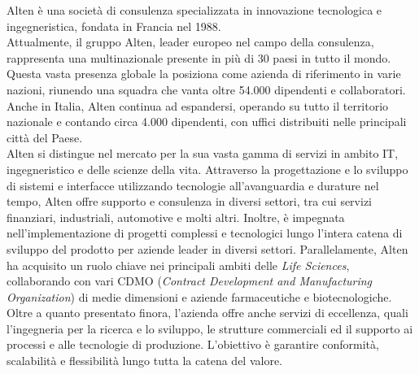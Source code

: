 Alten è una società di consulenza specializzata in innovazione tecnologica e ingegneristica, fondata in Francia nel 1988.\\
Attualmente, il gruppo Alten, leader europeo nel campo della consulenza, rappresenta una multinazionale presente in più di 30 paesi in tutto il mondo. Questa vasta presenza globale la posiziona come azienda di riferimento in varie nazioni, riunendo una squadra che vanta oltre 54.000 dipendenti e collaboratori. Anche in Italia, Alten continua ad espandersi, operando su tutto il territorio nazionale e contando circa 4.000 dipendenti, con uffici distribuiti nelle principali città del Paese.\\
Alten si distingue nel mercato per la sua vasta gamma di servizi in ambito IT, ingegneristico e delle scienze della vita. Attraverso la progettazione e lo sviluppo di sistemi e interfacce utilizzando tecnologie all'avanguardia e durature nel tempo, Alten offre supporto e consulenza in diversi settori, tra cui servizi finanziari, industriali, automotive e molti altri. Inoltre, è impegnata nell’implementazione di progetti complessi e tecnologici lungo l’intera catena di sviluppo del prodotto per aziende leader in diversi settori. Parallelamente, Alten ha acquisito un ruolo chiave nei principali ambiti delle \textit{Life Sciences}, collaborando con vari CDMO (\textit{Contract Development and Manufacturing Organization}) di medie dimensioni e aziende farmaceutiche e biotecnologiche. Oltre a quanto presentato finora, l'azienda offre anche servizi di eccellenza, quali l’ingegneria per la ricerca e lo sviluppo, le strutture commerciali ed il supporto ai processi e alle tecnologie di produzione. L’obiettivo è garantire conformità, scalabilità e flessibilità lungo tutta la catena del valore.

